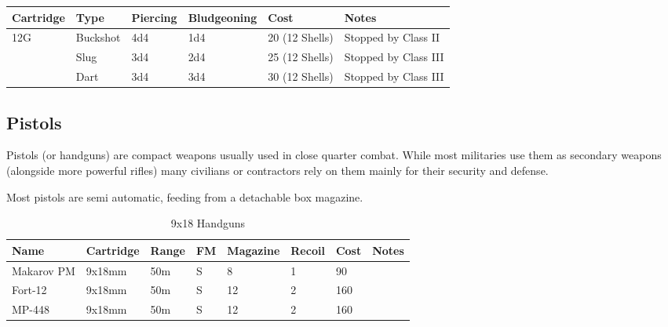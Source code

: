 \begin{center}
  \begin{tabular}{| l | l | l | l | l | l |}
    \hline
    \textbf{Cartridge}  & \textbf{Type}   & \textbf{Piercing} &
    \textbf{Bludgeoning} & \textbf{Cost}  & \textbf{Notes}        \\ \hline

    12G     & Buckshot & 4d4  & 1d4 & 20 (12 Shells) & Stopped by Class II \\ \hline
    \,      & Slug     & 3d4  & 2d4 & 25 (12 Shells) & Stopped by Class III \\ \hline
    \,      & Dart     & 3d4  & 3d4 & 30 (12 Shells) & Stopped by Class III \\ \hline

  \end{tabular}
\end{center}

\subsection{Pistols}

Pistols (or handguns) are compact weapons usually used in close quarter combat.
While most militaries use them as secondary weapons (alongside more powerful
rifles) many civilians or contractors rely on them mainly for their security
and defense.

Most pistols are semi automatic, feeding from a detachable box magazine.

\begin{table}
  \caption{9x18 Handguns}
  \begin{center}
    \begin{tabular}{| l | l | l | l | l | l | l | l |}
      \hline
      \textbf{Name} & \textbf{Cartridge} & \textbf{Range} &
      \textbf{FM} & \textbf{Magazine} & \textbf{Recoil} &
      \textbf{Cost} & \textbf{Notes} \\ \hline

      Makarov PM & 9x18mm & 50m & S & 8  & 1 & 90  & \\ \hline
      Fort-12    & 9x18mm & 50m & S & 12 & 2 & 160 & \\ \hline
      MP-448     & 9x18mm & 50m & S & 12 & 2 & 160 & \\ \hline

    \end{tabular}
  \end{center}
\end{table}

